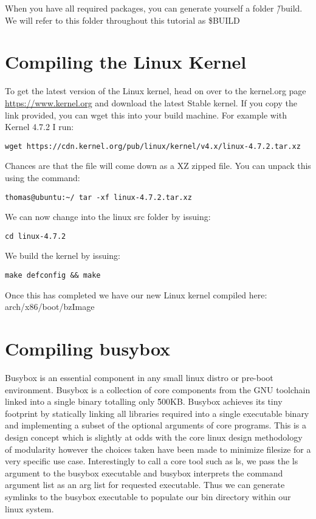 \documentclass[twocolumn]{article}
\begin{document}
When you have all required packages, you can generate yourself a folder \~/build. We will refer to this folder throughout this tutorial as \$BUILD

\section{Compiling the Linux Kernel}

To get the latest version of the Linux kernel, head on over to the kernel.org page \url{https://www.kernel.org} and download the latest Stable kernel. If you copy the link provided, you can wget this into your build machine. For example with Kernel 4.7.2 I run:
\begin{lstlisting}
wget https://cdn.kernel.org/pub/linux/kernel/v4.x/linux-4.7.2.tar.xz
\end{lstlisting}
Chances are that the file will come down as a XZ zipped file. You can unpack this using the command:
\begin{lstlisting}
thomas@ubuntu:~/ tar -xf linux-4.7.2.tar.xz
\end{lstlisting}
We can now change into the linux src folder by issuing:
\begin{lstlisting}
cd linux-4.7.2
\end{lstlisting}
We build the kernel by issuing:
\begin{lstlisting}
make defconfig && make
\end{lstlisting}
Once this has completed we have our new Linux kernel compiled here: arch/x86/boot/bzImage


\section{Compiling busybox}

Busybox is an essential component in any small linux distro or pre-boot environment. Busybox is a collection of core components from the GNU toolchain linked into a single binary totalling only \~500KB. Busybox achieves its tiny footprint by statically linking all libraries required into a single executable binary and implementing a subset of the optional arguments of core programs. This is a design concept which is slightly at odds with the core linux design methodology of modularity however the choices taken have been made to minimize filesize for a very specific use case. Interestingly to call a core tool such as ls, we pass the ls argument to the busybox executable and busybox interprets the command argument list as an arg list for requested executable. Thus we can generate symlinks to the busybox executable to populate our bin directory within our linux system.
\end{document}
